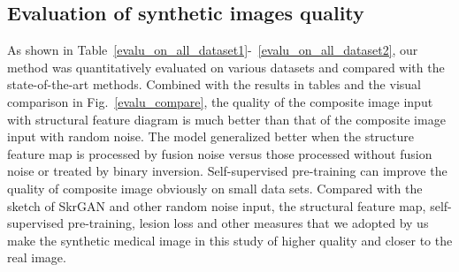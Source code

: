 \documentclass[runningheads]{llncs}
\begin{document}
	\subsection{Evaluation of synthetic images quality }
	As shown in Table~\ref{evalu_on_all_dataset1}-~\ref{evalu_on_all_dataset2}, our method was quantitatively evaluated on various datasets and compared with the state-of-the-art methods. Combined with the results in tables and the visual comparison in Fig.~\ref{evalu_compare}, the quality of the composite image input with structural feature diagram is much better than that of the composite image input with random noise. The model generalized better when the structure feature map is processed by fusion noise versus those processed without fusion noise or treated by binary inversion. Self-supervised pre-training can improve the quality of composite image obviously on small data sets. Compared with the sketch of SkrGAN and other random noise input, the structural feature map, self-supervised pre-training, lesion loss and other measures that we adopted by us make the synthetic medical image in this study of higher quality and closer to the real image.
	\begin{table}[thbp!]
		\begin{center}
			{\caption{Synthetic data availability verification on BRATS2015 tumor segmentor.}\label{availability_test}}
		\end{center}
	\end{table}
\end{document}

